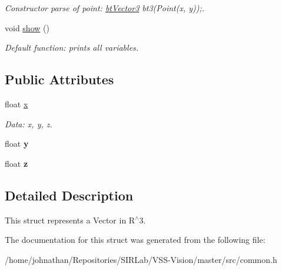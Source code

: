 \begin{DoxyCompactItemize}
\begin{DoxyCompactList}\small\item\em Constructor parse of point\+: \hyperlink{structcommon_1_1btVector3}{bt\+Vector3} bt3(\+Point(x, y));. \end{DoxyCompactList}\item 
void \hyperlink{structcommon_1_1btVector3_ad182266905d95459f9ca03da9af47f35}{show} ()\hypertarget{structcommon_1_1btVector3_ad182266905d95459f9ca03da9af47f35}{}\label{structcommon_1_1btVector3_ad182266905d95459f9ca03da9af47f35}

\begin{DoxyCompactList}\small\item\em Default function\+: prints all variables. \end{DoxyCompactList}\end{DoxyCompactItemize}
\subsection*{Public Attributes}
\begin{DoxyCompactItemize}
\item 
float \hyperlink{structcommon_1_1btVector3_adbe23ed6ae54734cbdf7b37788e0c702}{x}\hypertarget{structcommon_1_1btVector3_adbe23ed6ae54734cbdf7b37788e0c702}{}\label{structcommon_1_1btVector3_adbe23ed6ae54734cbdf7b37788e0c702}

\begin{DoxyCompactList}\small\item\em Data\+: x, y, z. \end{DoxyCompactList}\item 
float {\bfseries y}\hypertarget{structcommon_1_1btVector3_a5b52b09733d198cde3d283c0b2b320d1}{}\label{structcommon_1_1btVector3_a5b52b09733d198cde3d283c0b2b320d1}

\item 
float {\bfseries z}\hypertarget{structcommon_1_1btVector3_aa03665d96dd5d3dd2dbaeb6e9f24f4bc}{}\label{structcommon_1_1btVector3_aa03665d96dd5d3dd2dbaeb6e9f24f4bc}

\end{DoxyCompactItemize}


\subsection{Detailed Description}
This struct represents a Vector in R$^\wedge$3. 

The documentation for this struct was generated from the following file\+:\begin{DoxyCompactItemize}
\item 
/home/johnathan/\+Repositories/\+S\+I\+R\+Lab/\+V\+S\+S-\/\+Vision/master/src/common.\+h\end{DoxyCompactItemize}
